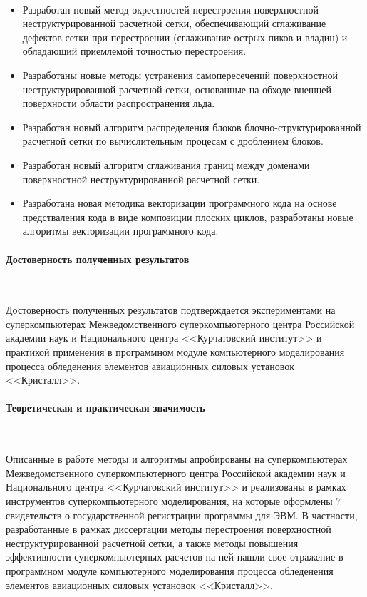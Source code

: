 \documentclass[a4paper,14pt]{extarticle}                     %
\theoremstyle{plain}                                         %
\begin{document}
\

\begin{itemize}[noitemsep,topsep=0pt,parsep=0pt,partopsep=0pt]
\item Разработан новый метод окрестностей перестроения поверхностной неструктурированной расчетной сетки, обеспечивающий сглаживание дефектов сетки при перестроении (сглаживание острых пиков и владин) и обладающий приемлемой точностью перестроения.
\item Разработаны новые методы устранения самопересечений поверхностной неструктурированной расчетной сетки, основанные на обходе внешней поверхности области распространения льда.
\item Разработан новый алгоритм распределения блоков блочно-структурированной расчетной сетки по вычислительным процесам с дроблением блоков.
\item Разработан новый алгоритм сглаживания границ между доменами поверхностной неструктурированной расчетной сетки.
\item Разработана новая методика векторизации программного кода на основе предстваления кода в виде композиции плоских циклов, разработаны новые алгоритмы векторизации программного кода.
\end{itemize}

\paragraph{Достоверность полученных результатов}

\

Достоверность полученных результатов подтверждается экспериментами на суперкомпьютерах Межведомственного суперкомпьютерного центра Российской академии наук и Национального центра <<Курчатовский институт>> и практикой применения в программном модуле компьютерного моделирования процесса обледенения элементов авиационных силовых установок <<Кристалл>>.

\paragraph{Теоретическая и практическая значимость}

\

Описанные в работе методы и алгоритмы апробированы на суперкомпьютерах Межведомственного суперкомпьютерного центра Российской академии наук и Национального центра <<Курчатовский институт>> и реализованы в рамках инструментов суперкомпьютерного моделирования, на которые оформлены 7 свидетельств о государственной регистрации программы для ЭВМ.
В частности, разработанные в рамках диссертации методы перестроения поверхностной неструктурированной расчетной сетки, а также методы повышения эффективности суперкомпьютерных расчетов на ней нашли свое отражение в программном модуле компьютерного моделирования процесса обледенения элементов авиационных силовых установок <<Кристалл>>.
\end{document}
